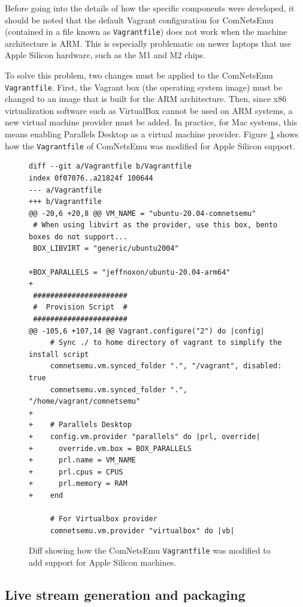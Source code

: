 Before going into the details of how the specific components were developed, it should be noted that the default Vagrant configuration for ComNetsEmu (contained in a file known as \texttt{Vagrantfile}) does not work when the machine architecture is ARM. This is especially problematic on newer laptops that use Apple Silicon hardware, such as the M1 and M2 chips.

To solve this problem, two changes must be applied to the ComNetsEmu \texttt{Vagrantfile}. First, the Vagrant box (the operating system image) must be changed to an image that is built for the ARM architecture. Then, since x86 virtualization software such as VirtualBox cannot be used on ARM systems, a new virtual machine provider must be added. In practice, for Mac systems, this means enabling Parallels Desktop as a virtual machine provider. Figure \ref{fig:vagrantfile} shows how the \texttt{Vagrantfile} of ComNetsEmu was modified for Apple Silicon support.

\begin{figure}
    \centering
    \begin{verbatim}
diff --git a/Vagrantfile b/Vagrantfile
index 0f07076..a21824f 100644
--- a/Vagrantfile
+++ b/Vagrantfile
@@ -20,6 +20,8 @@ VM_NAME = "ubuntu-20.04-comnetsemu"
 # When using libvirt as the provider, use this box, bento boxes do not support...
 BOX_LIBVIRT = "generic/ubuntu2004"

+BOX_PARALLELS = "jeffnoxon/ubuntu-20.04-arm64"
+
 ######################
 #  Provision Script  #
 ######################
@@ -105,6 +107,14 @@ Vagrant.configure("2") do |config|
     # Sync ./ to home directory of vagrant to simplify the install script
     comnetsemu.vm.synced_folder ".", "/vagrant", disabled: true
     comnetsemu.vm.synced_folder ".", "/home/vagrant/comnetsemu"
+
+    # Parallels Desktop
+    config.vm.provider "parallels" do |prl, override|
+      override.vm.box = BOX_PARALLELS
+      prl.name = VM_NAME
+      prl.cpus = CPUS
+      prl.memory = RAM
+    end

     # For Virtualbox provider
     comnetsemu.vm.provider "virtualbox" do |vb|
    \end{verbatim}
    \caption{Diff showing how the ComNetsEmu \texttt{Vagrantfile} was modified to add support for Apple Silicon machines.}
    \label{fig:vagrantfile}
\end{figure}


\subsection{Live stream generation and packaging}
\label{sec:eval/testbed/packaging}

